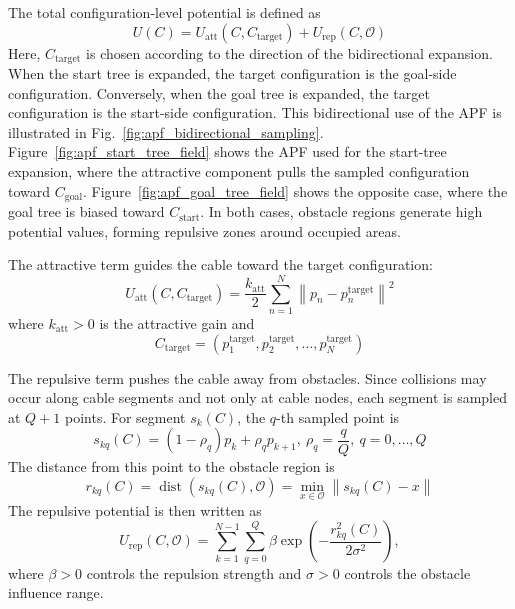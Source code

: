 \documentclass{pas}
\begin{document}
The total configuration-level potential is defined as
\begin{equation}
U(C)
=
U_{\mathrm{att}}(C,C_{\mathrm{target}})
+
U_{\mathrm{rep}}(C,\mathcal{O})
\label{eq:gcr_total_configuration_potential}
\end{equation}
Here, $C_{\mathrm{target}}$ is chosen according to the direction of the bidirectional expansion. When the start tree is expanded, the target configuration is the goal-side configuration. Conversely, when the goal tree is expanded, the target configuration is the start-side configuration. This bidirectional use of the APF is illustrated in Fig.~\ref{fig:apf_bidirectional_sampling}. Figure~\ref{fig:apf_start_tree_field} shows the APF used for the start-tree expansion, where the attractive component pulls the sampled configuration toward $C_{\mathrm{goal}}$. Figure~\ref{fig:apf_goal_tree_field} shows the opposite case, where the goal tree is biased toward $C_{\mathrm{start}}$. In both cases, obstacle regions generate high potential values, forming repulsive zones around occupied areas.

The attractive term guides the cable toward the target configuration:
\begin{equation}
U_{\mathrm{att}}(C,C_{\mathrm{target}})
=
\frac{k_{\mathrm{att}}}{2}
\sum_{n=1}^{N}
\left\|
p_n-p_n^{\mathrm{target}}
\right\|^2
\label{eq:gcr_attractive_potential}
\end{equation}
where $k_{\mathrm{att}}>0$ is the attractive gain and
\begin{equation}
C_{\mathrm{target}}
=
\left(
p_1^{\mathrm{target}},
p_2^{\mathrm{target}},
\ldots,
p_N^{\mathrm{target}}
\right)
\label{eq:gcr_target_configuration_points}
\end{equation}

The repulsive term pushes the cable away from obstacles. Since collisions may occur along cable segments and not only at cable nodes, each segment is sampled at $Q+1$ points. For segment $s_k(C)$, the $q$-th sampled point is
\begin{equation}
s_{kq}(C)
=
(1-\rho_q)p_k
+
\rho_q p_{k+1},
\
\rho_q
=
\frac{q}{Q},
\
q=0,\ldots,Q
\label{eq:gcr_segment_sample_points}
\end{equation}
The distance from this point to the obstacle region is
\begin{equation}
r_{kq}(C)
=
\operatorname{dist}
\left(
s_{kq}(C),\mathcal{O}
\right)
=
\min_{x\in\mathcal{O}}
\left\|
s_{kq}(C)-x
\right\|
\label{eq:gcr_segment_obstacle_distance}
\end{equation}
The repulsive potential is then written as
\begin{equation}
U_{\mathrm{rep}}(C,\mathcal{O})
=
\sum_{k=1}^{N-1}
\sum_{q=0}^{Q}
\beta
\exp
\left(
-\frac{r_{kq}^{2}(C)}{2\sigma^{2}}
\right),
\label{eq:gcr_repulsive_potential}
\end{equation}
where $\beta>0$ controls the repulsion strength and $\sigma>0$ controls the obstacle influence range.
\end{document}
